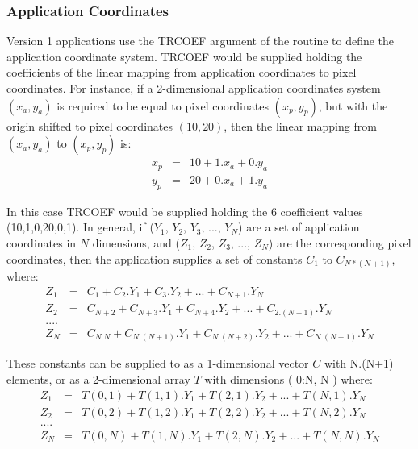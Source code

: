 \documentclass[11pt,nolof]{starlink}
\begin{document}
\subsubsection{Application Coordinates}
Version 1 applications use the TRCOEF argument of the 
routine to define the application coordinate system. TRCOEF would be supplied
holding the
coefficients of the linear mapping from application coordinates to pixel
coordinates. For instance, if a 2-dimensional application coordinates system
$(x_{a},y_{a})$ is required to be equal to pixel coordinates $(x_{p},y_{p})$,
but with the origin shifted to pixel coordinates $(10,20)$, then the linear
mapping from $(x_{a},y_{a})$ to $(x_{p},y_{p})$ is:
\small
\begin{eqnarray*}
x_{p} & = & 10 + 1.x_{a} + 0.y_{a} \\
y_{p} & = & 20 + 0.x_{a} + 1.y_{a}
\end{eqnarray*}
\normalsize

In this case TRCOEF would be supplied holding the 6 coefficient values
(10,1,0,20,0,1). In general, if ($Y_{1}$, $Y_{2}$, $Y_{3}$, ..., $Y_{N}$) are a
set of application coordinates in $N$ dimensions, and ($Z_{1}$, $Z_{2}$,
$Z_{3}$, ..., $Z_{N}$) are the corresponding pixel coordinates, then the
application supplies a set of constants $C_{1}$ to $C_{N*(N+1)}$, where:
\small
\begin{eqnarray*}
Z_{1} & = & C_{1} + C_{2}.Y_{1} + C_{3}.Y_{2} + ... + C_{N+1}.Y_{N} \\
Z_{2} & = & C_{N+2} + C_{N+3}.Y_{1} + C_{N+4}.Y_{2} + ... + C_{2.(N+1)}.Y_{N} \\
 ....\\
Z_{N} & = & C_{N.N} + C_{N.(N+1)}.Y_{1} + C_{N.(N+2)}.Y_{2} + ... + C_{N.(N+1)}.Y_{N}
\end{eqnarray*}
\normalsize

These constants can be supplied to  as a 1-dimensional vector
$C$ with N.(N+1) elements, or as a 2-dimensional array $T$ with dimensions
( 0:N, N ) where:
\small
\begin{eqnarray*}
Z_{1} & = & T(0,1) + T(1,1).Y_{1} + T(2,1).Y_{2} + ... + T(N,1).Y_{N} \\
Z_{2} & = & T(0,2) + T(1,2).Y_{1} + T(2,2).Y_{2} + ... + T(N,2).Y_{N} \\
 ....\\
Z_{N} & = & T(0,N) + T(1,N).Y_{1} + T(2,N).Y_{2} + ... + T(N,N).Y_{N}
\end{eqnarray*}
\normalsize
\end{document}
